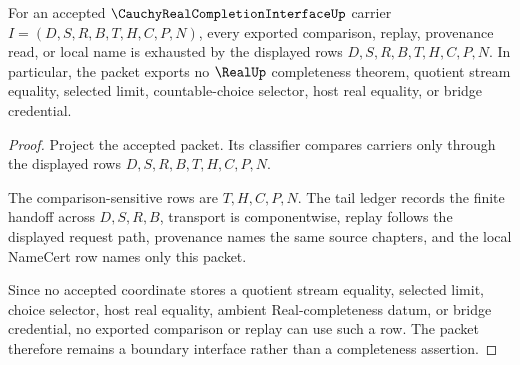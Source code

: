 \begin{theorem}
\label{thm:cauchy-real-completion-interface-nonescape}
For an accepted $\CauchyRealCompletionInterfaceUp$ carrier $I=(D,S,R,B,T,H,C,P,N)$, every exported comparison, replay, provenance read, or local name is exhausted by the displayed rows $D,S,R,B,T,H,C,P,N$. In particular, the packet exports no $\RealUp$ completeness theorem, quotient stream equality, selected limit, countable-choice selector, host real equality, or bridge credential.
\end{theorem}
\begin{proof}
Project the accepted packet. Its classifier compares carriers only through the displayed rows $D,S,R,B,T,H,C,P,N$.

The comparison-sensitive rows are $T,H,C,P,N$. The tail ledger records the finite handoff across $D,S,R,B$, transport is componentwise, replay follows the displayed request path, provenance names the same source chapters, and the local NameCert row names only this packet.

Since no accepted coordinate stores a quotient stream equality, selected limit, choice selector, host real equality, ambient Real-completeness datum, or bridge credential, no exported comparison or replay can use such a row. The packet therefore remains a boundary interface rather than a completeness assertion.
\end{proof}

